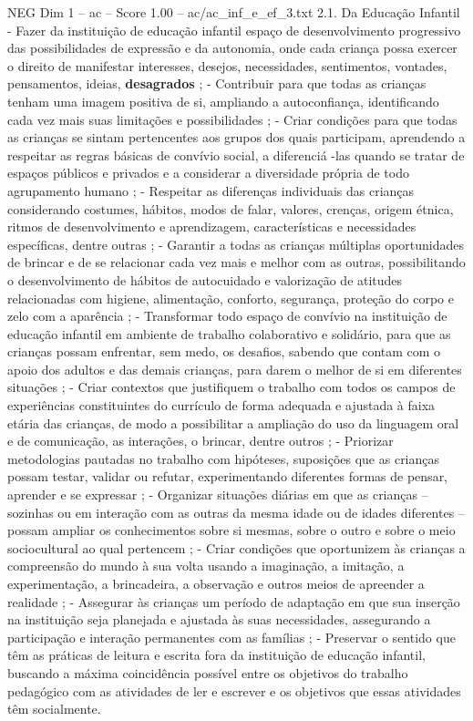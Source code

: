 \begin{textsample}{NEG Dim 1 – ac – Score 1.00 – ac/ac\_inf\_e\_ef\_3.txt}  \label{ex:f1_neg_111}
2.1.
Da Educação Infantil - Fazer da instituição de educação infantil espaço de desenvolvimento progressivo das possibilidades de expressão e da autonomia, onde cada criança possa exercer o direito de manifestar interesses, desejos, necessidades, sentimentos, vontades, pensamentos, ideias, \textbf{desagrados} ; - Contribuir para que todas as crianças tenham uma imagem positiva de si, ampliando a autoconfiança, identificando cada vez mais suas limitações e possibilidades ; - Criar condições para que todas as crianças se sintam pertencentes aos grupos dos quais participam, aprendendo a respeitar as regras básicas de convívio social, a diferenciá -las quando se tratar de espaços públicos e privados e a considerar a diversidade própria de todo agrupamento humano ; - Respeitar as diferenças individuais das crianças considerando costumes, hábitos, modos de falar, valores, crenças, origem étnica, ritmos de desenvolvimento e aprendizagem, características e necessidades específicas, dentre outras ; - Garantir a todas as crianças múltiplas oportunidades de brincar e de se relacionar cada vez mais e melhor com as outras, possibilitando o desenvolvimento de hábitos de autocuidado e valorização de atitudes relacionadas com higiene, alimentação, conforto, segurança, proteção do corpo e zelo com a aparência ; - Transformar todo espaço de convívio na instituição de educação infantil em ambiente de trabalho colaborativo e solidário, para que as crianças possam enfrentar, sem medo, os desafios, sabendo que contam com o apoio dos adultos e das demais crianças, para darem o melhor de si em diferentes situações ; - Criar contextos que justifiquem o trabalho com todos os campos de experiências constituintes do currículo de forma adequada e ajustada à faixa etária das crianças, de modo a possibilitar a ampliação do uso da linguagem oral e de comunicação, as interações, o brincar, dentre outros ; - Priorizar metodologias pautadas no trabalho com hipóteses, suposições que as crianças possam testar, validar ou refutar, experimentando diferentes formas de pensar, aprender e se expressar ; - Organizar situações diárias em que as crianças – sozinhas ou em interação com as outras da mesma idade ou de idades diferentes – possam ampliar os conhecimentos sobre si mesmas, sobre o outro e sobre o meio sociocultural ao qual pertencem ; - Criar condições que oportunizem às crianças a compreensão do mundo à sua volta usando a imaginação, a imitação, a experimentação, a brincadeira, a observação e outros meios de apreender a realidade ; - Assegurar às crianças um período de adaptação em que sua inserção na instituição seja planejada e ajustada às suas necessidades, assegurando a participação e interação permanentes com as famílias ; - Preservar o sentido que têm as práticas de leitura e escrita fora da instituição de educação infantil, buscando a máxima coincidência possível entre os objetivos do trabalho pedagógico com as atividades de ler e escrever e os objetivos que essas atividades têm socialmente.

\end{textsample}
